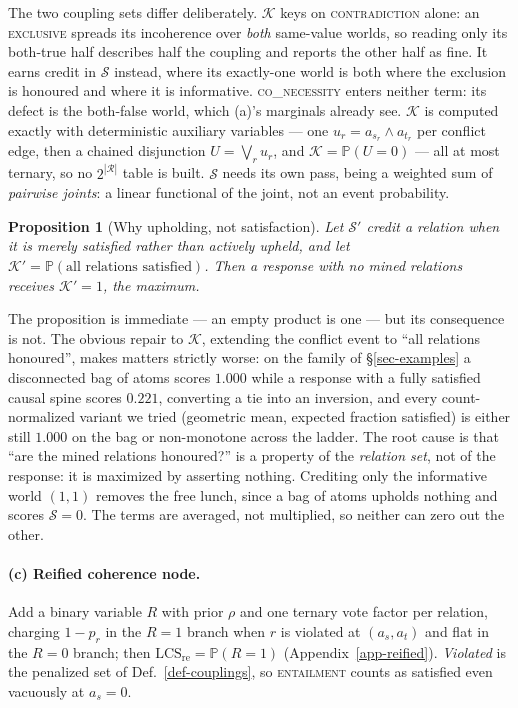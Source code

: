 \documentclass{article} %
\newtheorem{proposition}{Proposition}
\newcommand{\pr}[1]{\mathbb{P}\!\left( #1 \right)}
\newcommand{\coupling}[1]{\textsc{#1}}          %
\newcommand{\LCS}{\mathrm{LCS}}
\newcommand{\readout}[1]{\ensuremath{\mathrm{#1}}}
\newcommand{\rei}{\readout{re}}
\begin{document}
The two coupling sets differ deliberately. $\mathcal{K}$ keys on \coupling{contradiction} alone:
an \coupling{exclusive} spreads its incoherence over \emph{both} same-value worlds, so reading
only its both-true half describes half the coupling and reports the other half as fine. It earns
credit in $\mathcal{S}$ instead, where its exactly-one world is both where the exclusion is
honoured and where it is informative. \coupling{co\_necessity} enters neither term: its defect is
the both-false world, which (a)'s marginals already see. $\mathcal{K}$ is computed exactly with
deterministic auxiliary variables --- one $u_r=a_{s_r}\!\wedge a_{t_r}$ per conflict edge, then a
chained disjunction $U=\bigvee_r u_r$, and $\mathcal{K}=\pr{U{=}0}$ --- all at most ternary, so no
$2^{|\mathcal{R}|}$ table is built. $\mathcal{S}$ needs its own pass, being a weighted sum of
\emph{pairwise joints}: a linear functional of the joint, not an event probability.

\begin{proposition}[Why upholding, not satisfaction]
\label{prop-vacuous}
Let $\mathcal{S}'$ credit a relation when it is merely \emph{satisfied} rather than
actively upheld, and let $\mathcal{K}'=\pr{\text{all relations satisfied}}$. Then a response
with no mined relations receives $\mathcal{K}'=1$, the maximum.
\end{proposition}

The proposition is immediate --- an empty product is one --- but its consequence is not. The
obvious repair to $\mathcal{K}$, extending the conflict event to ``all relations honoured'',
makes matters strictly worse: on the family of \S\ref{sec-examples} a disconnected bag of atoms
scores $1.000$ while a response with a fully satisfied causal spine scores $0.221$, converting a
tie into an inversion, and every count-normalized variant we tried (geometric mean, expected
fraction satisfied) is either still $1.000$ on the bag or non-monotone across the ladder. The
root cause is that ``are the mined relations honoured?'' is a property of the \emph{relation
set}, not of the response: it is maximized by asserting nothing. Crediting only the informative
world $(1,1)$ removes the free lunch, since a bag of atoms upholds nothing and scores
$\mathcal{S}=0$. The terms are averaged, not multiplied, so neither can zero out the other.

\paragraph{(c) Reified coherence node.} Add a binary variable $R$ with prior $\rho$ and one
ternary vote factor per relation, charging $1-p_r$ in the $R{=}1$ branch when $r$ is violated at
$(a_s,a_t)$ and flat in the $R{=}0$ branch; then $\LCS_{\rei}=\pr{R=1}$
(Appendix~\ref{app-reified}). \emph{Violated} is the penalized set of Def.~\ref{def-couplings}, so
\coupling{entailment} counts as satisfied even vacuously at $a_s=0$.
\end{document}
